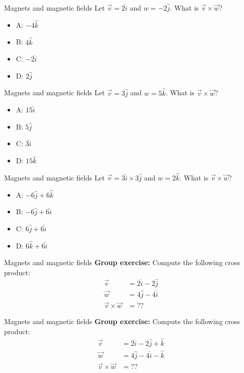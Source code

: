 \documentclass{beamer}
\begin{document}
\begin{frame}{Magnets and magnetic fields}
Let $\vec{v} = 2\hat{i}$ and $w = -2 \hat{j}$.  What is $\vec{v} \times \vec{w}$?
\begin{itemize}
\item A: $-4 \hat{k}$
\item B: $4 \hat{k}$
\item C: $-2 \hat{i}$
\item D: $2 \hat{j}$
\end{itemize}
\end{frame}

\begin{frame}{Magnets and magnetic fields}
Let $\vec{v} = 3\hat{j}$ and $w = 5 \hat{k}$.  What is $\vec{v} \times \vec{w}$?
\begin{itemize}
\item A: $15 \hat{i}$
\item B: $5 \hat{j}$
\item C: $3 \hat{i}$
\item D: $15 \hat{k}$
\end{itemize}
\end{frame}

\begin{frame}{Magnets and magnetic fields}
Let $\vec{v} = 3\hat{i} \times 3\hat{j}$ and $w = 2 \hat{k}$.  What is $\vec{v} \times \vec{w}$?
\begin{itemize}
\item A: $-6 \hat{j} + 6\hat{k}$
\item B: $-6 \hat{j} + 6\hat{i}$
\item C: $6 \hat{j} + 6\hat{i}$
\item D: $6 \hat{k} + 6\hat{i}$
\end{itemize}
\end{frame}

\begin{frame}{Magnets and magnetic fields}
\textbf{Group exercise:} Compute the following cross product:
\begin{align}
\vec{v} &= 2\hat{i}-2\hat{j} \\
\vec{w} &= 4\hat{j}-4\hat{i} \\
\vec{v} \times \vec{w} &= ??
\end{align}
\end{frame}

\begin{frame}{Magnets and magnetic fields}
\textbf{Group exercise:} Compute the following cross product:
\begin{align}
\vec{v} &= 2\hat{i}-2\hat{j}+\hat{k} \\
\vec{w} &= 4\hat{j}-4\hat{i}-\hat{k} \\
\vec{v} \times \vec{w} &= ??
\end{align}
\end{frame}
\end{document}

